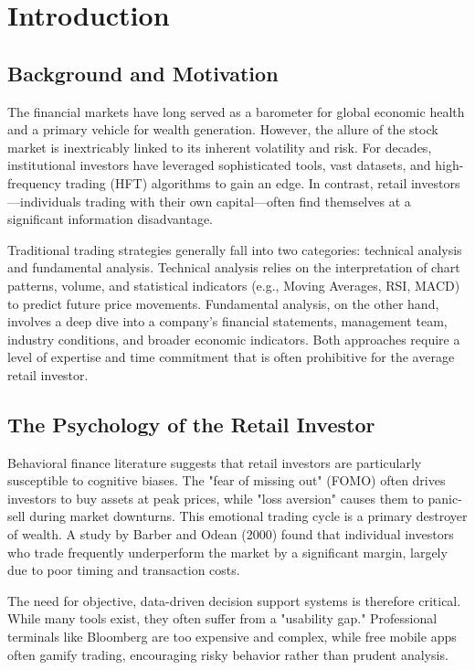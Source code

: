 \section{Introduction}

\subsection{Background and Motivation}
The financial markets have long served as a barometer for global economic health and a primary vehicle for wealth generation. However, the allure of the stock market is inextricably linked to its inherent volatility and risk. For decades, institutional investors have leveraged sophisticated tools, vast datasets, and high-frequency trading (HFT) algorithms to gain an edge. In contrast, retail investors—individuals trading with their own capital—often find themselves at a significant information disadvantage.

Traditional trading strategies generally fall into two categories: technical analysis and fundamental analysis. Technical analysis relies on the interpretation of chart patterns, volume, and statistical indicators (e.g., Moving Averages, RSI, MACD) to predict future price movements. Fundamental analysis, on the other hand, involves a deep dive into a company's financial statements, management team, industry conditions, and broader economic indicators. Both approaches require a level of expertise and time commitment that is often prohibitive for the average retail investor.

\subsection{The Psychology of the Retail Investor}
Behavioral finance literature suggests that retail investors are particularly susceptible to cognitive biases. The "fear of missing out" (FOMO) often drives investors to buy assets at peak prices, while "loss aversion" causes them to panic-sell during market downturns. This emotional trading cycle is a primary destroyer of wealth. A study by Barber and Odean (2000) found that individual investors who trade frequently underperform the market by a significant margin, largely due to poor timing and transaction costs.

The need for objective, data-driven decision support systems is therefore critical. While many tools exist, they often suffer from a "usability gap." Professional terminals like Bloomberg are too expensive and complex, while free mobile apps often gamify trading, encouraging risky behavior rather than prudent analysis.

